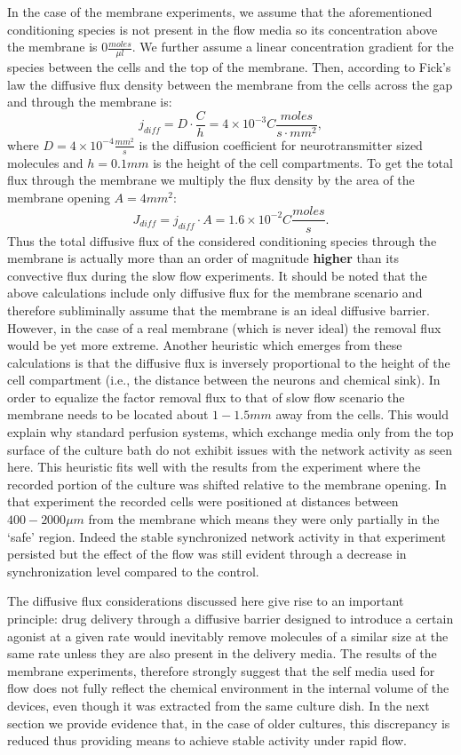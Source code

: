         In the case of the membrane experiments, we assume that the aforementioned conditioning species is not present in the flow media so its concentration above the membrane is \(0\frac{moles}{\mu l}\). We further assume a linear concentration gradient for the species between the cells and the top of the membrane. Then, according to Fick's law the diffusive flux density between the membrane from the cells across the gap and through the membrane is: \[j_{diff}=D\cdot\frac{C}{h}=4\times 10^{-3}C \frac{moles}{s\cdot mm^{2}},\] where \(D=4\times 10^{-4}\frac{mm^2}{s}\) is the diffusion coefficient for neurotransmitter sized molecules and \(h=0.1 mm\) is the height of the cell compartments. To get the total flux through the membrane we multiply the flux density by the area of the membrane opening \(A=4 mm^{2}\): \[J_{diff}=j_{diff}\cdot A=1.6\times 10^{-2}C\frac{moles}{s}.\] Thus the total diffusive flux of the considered conditioning species through the membrane is actually more than an order of magnitude \textbf{higher} than its convective flux during the slow flow experiments. It should be noted that the above calculations include only diffusive flux for the membrane scenario and therefore subliminally assume that the membrane is an ideal diffusive barrier. However, in the case of a real membrane (which is never ideal) the removal flux would be yet more extreme. Another heuristic which emerges from these calculations is that the diffusive flux is inversely proportional to the height of the cell compartment (i.e., the distance between the neurons and chemical sink). In order to equalize the factor removal flux to that of slow flow scenario the membrane needs to be located about \(1-1.5 mm\) away from the cells. This would explain why standard perfusion systems, which exchange media only from the top surface of the culture bath do not exhibit issues with the network activity as seen here. This heuristic fits well with the results from the experiment where the recorded portion of the culture was shifted relative to the membrane opening. In that experiment the recorded cells were positioned at distances between \(400-2000\mu m\) from the membrane which means they were only partially in the `safe' region. Indeed the stable synchronized network activity in that experiment persisted but the effect of the flow was still evident through a decrease in synchronization level compared to the control.

        The diffusive flux considerations discussed here give rise to an important principle: drug delivery through a diffusive barrier designed to introduce a certain agonist at a given rate would inevitably remove molecules of a similar size at the same rate unless they are also present in the delivery media. The results of the membrane experiments, therefore strongly suggest that the self media used for flow does not fully reflect the chemical environment in the internal volume of the devices, even though it was extracted from the same culture dish. In the next section we provide evidence that, in the case of older cultures, this discrepancy is reduced thus providing means to achieve stable activity under rapid flow.

